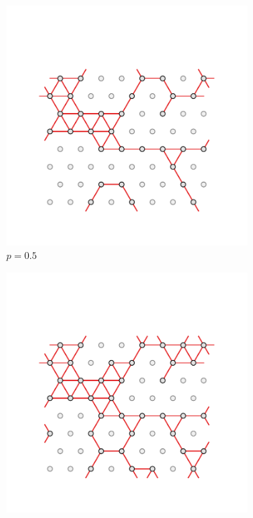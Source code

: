 \begin{figure}[bt]
     \vspace{0.5cm}
      \begin{subfigure}[b]{0.3\textwidth}
         \centering
         \includegraphics[width=\textwidth]{./figures/targeted_opt/perc_tri_5.pdf}
         \caption{$p=0.5$}
         \label{fig:perctri5}
     \end{subfigure}
     \hfill
      \begin{subfigure}[b]{0.3\textwidth}
         \centering
         \includegraphics[width=\textwidth]{./figures/targeted_opt/perc_tri_6.pdf}

\end{subfigure}
\end{figure}
